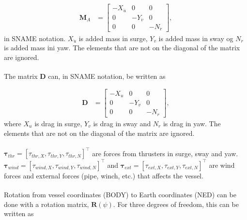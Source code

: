 \documentclass[a4paper]{article}
\begin{document}
\begin{equation}
\label{eq:MA_matrix}
\begin{aligned}
	\boldsymbol{M}_A &=
		\left[ \begin{array}{ccc}
			-X_{\dot{u}} &  0 & 0 \\
			0 &  -Y_{\dot{v}} & 0 \\
			0 & 0 &  -N_{\dot{r}} 
		\end{array} \right],
\end{aligned}
\end{equation}
%
in SNAME notation. $X_{\dot{u}}$ is added mass in surge, $Y_{\dot{v}}$ is added mass in sway og $N_{\dot{r}}$ is added mass ini yaw. The elements that are not on
the diagonal of the matrix are ignored.
\\
\\
The matrix $\boldsymbol{D}$ can, in SNAME notation, be written as

\begin{equation}
\label{eq:D_matrise}
\begin{aligned}
	\boldsymbol{D} &=
		\left[ \begin{array}{ccc}
			-X_u &  0 & 0 \\
			0 &  -Y_v & 0 \\
			0 & 0 &  -N_r 
		\end{array} \right],
\end{aligned}
\end{equation}
%
where $X_u$ is drag in surge, $Y_v$ is drag in sway and $N_r$ is drag in yaw. The elements that are not on the diagonal of the matrix are ignored.
\\
\\
$\boldsymbol{\tau}_{thr} = [\tau_{thr,X}, \tau_{thr,Y}, \tau_{thr,N}]^{\top}$ are forces from thrusters in surge, sway and yaw. 
$\boldsymbol{\tau}_{wind} = [\tau_{wind,X}, \tau_{wind,Y}, \tau_{wind,N}]^{\top}$ and $\boldsymbol{\tau}_{ext} =
 [\tau_{ext,X}, \tau_{ext,Y}, \tau_{ext,N}]^{\top}$ are wind forces and external forces (pipe, winch, etc.) that affects the vessel.
\\
\\
Rotation from vessel coordinates (BODY) to Earth coordinates (NED) can be done with a rotation matrix, $\boldsymbol{R}(\psi)$. For three degrees of freedom, this can be written as
\end{document}

